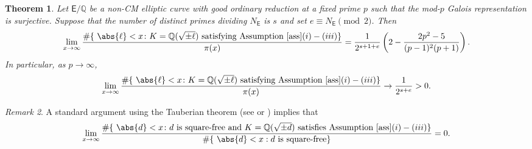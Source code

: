 \documentclass{amsart}
\newtheorem{theorem}{Theorem}[section]
\numberwithin{equation}{section}
\theoremstyle{remark}
\newtheorem{remark}[theorem]{Remark}
\newcommand{\Q}{\mathbb{Q}}
\newcommand{\EC}{\mathsf{E}}
\theoremstyle{plain} %
\begin{document}
\begin{theorem}
\label{density result}
Let $\EC/\Q$ be a non-CM elliptic curve with good ordinary reduction at a fixed prime $p$ such that the mod-$p$ Galois representation is surjective.
Suppose that the number of distinct primes dividing $N_{\EC}$ is $s$ and set $e \equiv N_{\EC} \pmod{2}$.
Then
\[
\lim_{x \to \infty}\frac{ \# \{ \ \abs{\ell} < x \colon K = \Q(\sqrt{\pm \ell}) \text{ satisfying Assumption}~\ref{ass}(i)-(iii)\}}{\pi(x)} = \frac{1}{2^{s+1+e}}\left( 2 - \frac{2p^2 -5}{(p-1)^2(p+1)}\right).
\]
In particular, as $p\to \infty$,
\[
\lim_{x \to \infty}\frac{ \# \{ \ \abs{\ell} < x \colon K = \Q(\sqrt{\pm \ell}) \text{ satisfying Assumption}~\ref{ass}(i)-(iii)\}}{\pi(x)} \to \frac{1}{2^{s+e}} > 0.
\]
\end{theorem}

\begin{remark}
A standard argument using the Tauberian theorem (see \cite[Theorem~7.1]{Wood} or \cite{Narkiewicz}) implies that
\[
\lim_{x \to \infty}\frac{ \# \{ \ \abs{d} < x \colon d \text{ is square-free and } K = \Q(\sqrt{\pm d}) \text{ satisfies Assumption}~\ref{ass}(i)-(iii)\}}{\#\{ \ \abs{d} < x : d \text{ is square-free} \}} = 0.
\]
\end{remark}



\end{document}

